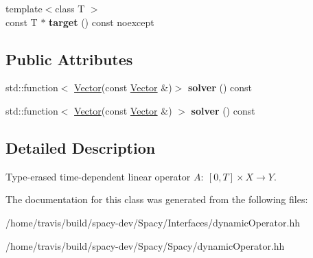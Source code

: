 \begin{DoxyCompactItemize}
\item 
\hypertarget{classSpacy_1_1DynamicLinearOperator_a1bb194c6f220a136916f661314f543ae}{{\footnotesize template$<$class T $>$ }\\const \-T $\ast$ {\bfseries target} () const noexcept}\label{classSpacy_1_1DynamicLinearOperator_a1bb194c6f220a136916f661314f543ae}

\end{DoxyCompactItemize}
\subsection*{\-Public \-Attributes}
\begin{DoxyCompactItemize}
\item 
\hypertarget{classSpacy_1_1DynamicLinearOperator_a3b71ed286c03e820a0c1f0d3ab695bd4}{std\-::function$<$ \hyperlink{classSpacy_1_1Vector}{\-Vector}(const \*
\hyperlink{classSpacy_1_1Vector}{\-Vector} \&)$>$ {\bfseries solver} () const }\label{classSpacy_1_1DynamicLinearOperator_a3b71ed286c03e820a0c1f0d3ab695bd4}

\item 
\hypertarget{classSpacy_1_1DynamicLinearOperator_a6f49a1ad1b5d61b21b1d0155d5eda3f8}{std\-::function$<$ \hyperlink{classSpacy_1_1Vector}{\-Vector}(const \*
\hyperlink{classSpacy_1_1Vector}{\-Vector} \&) $>$ {\bfseries solver} () const }\label{classSpacy_1_1DynamicLinearOperator_a6f49a1ad1b5d61b21b1d0155d5eda3f8}

\end{DoxyCompactItemize}


\subsection{\-Detailed \-Description}
\-Type-\/erased time-\/dependent linear operator $A:\ [0,T] \times X \to Y $. 

\-The documentation for this class was generated from the following files\-:\begin{DoxyCompactItemize}
\item 
/home/travis/build/spacy-\/dev/\-Spacy/\-Interfaces/dynamic\-Operator.\-hh\item 
/home/travis/build/spacy-\/dev/\-Spacy/\-Spacy/dynamic\-Operator.\-hh\end{DoxyCompactItemize}
